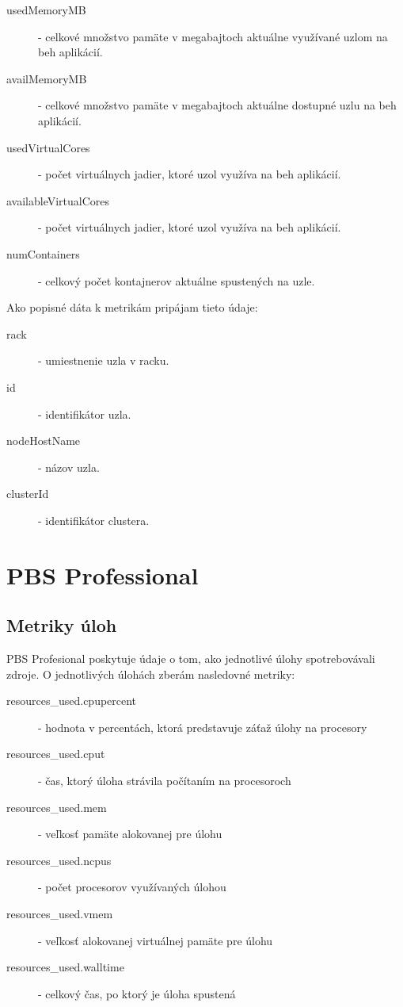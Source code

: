 \documentclass[printed,11pt,twoside,color,cover,table]{fithesis3}
\begin{document}
\begin{description}
\item[usedMemoryMB] - celkové množstvo pamäte v megabajtoch aktuálne využívané uzlom na beh aplikácií.
\item[availMemoryMB] - celkové množstvo pamäte v megabajtoch aktuálne dostupné uzlu na beh aplikácií.
\item[usedVirtualCores] - počet virtuálnych jadier, ktoré uzol využíva na beh aplikácií.
\item[availableVirtualCores] - počet virtuálnych jadier, ktoré uzol využíva na beh aplikácií.
\item[numContainers] - celkový počet kontajnerov aktuálne spustených na uzle.
\end{description}

Ako popisné dáta k metrikám pripájam tieto údaje:
\begin{description}
\item[rack] - umiestnenie uzla v racku.
\item[id] - identifikátor uzla.
\item[nodeHostName] - názov uzla.
\item[clusterId] - identifikátor clustera.
\end{description}

\section{PBS Professional}
\subsection{Metriky úloh}
PBS Profesional poskytuje údaje o tom, ako jednotlivé úlohy spotrebovávali zdroje. O jednotlivých úlohách zberám nasledovné metriky:

\begin{description}
\item[resources\_used.cpupercent] - hodnota v percentách, ktorá predstavuje záťaž úlohy na procesory
\item[resources\_used.cput] - čas, ktorý úloha strávila počítaním na procesoroch
\item[resources\_used.mem] - veľkosť pamäte alokovanej pre úlohu
\item[resources\_used.ncpus] - počet procesorov využívaných úlohou
\item[resources\_used.vmem] - veľkosť alokovanej virtuálnej pamäte pre úlohu
\item[resources\_used.walltime] - celkový čas, po ktorý je úloha spustená
\end{description}
\end{document}
